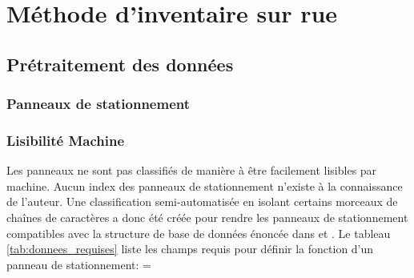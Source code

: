 \section{Méthode d'inventaire sur rue}
  \subsection{Prétraitement des données}
    \subsubsection{Panneaux de stationnement}
      \subsubsection{Lisibilité Machine}
        Les panneaux ne sont pas classifiés de manière à être facilement lisibles par machine. Aucun index des panneaux de stationnement n'existe à la connaissance de l'auteur. Une classification semi-automatisée en isolant certains morceaux de chaînes de caractères a donc été créée pour rendre les panneaux de stationnement compatibles avec la structure de base de données énoncée dans \textcite{Bourdeau:MethodologieAnalyse:2014} et \textcite{Morency:DeveloppementMise:2022}. Le tableau \ref{tab:donnees_requises} liste les champs requis pour définir la fonction d'un panneau de stationnement:
        \LTcapwidth=\textwidth

